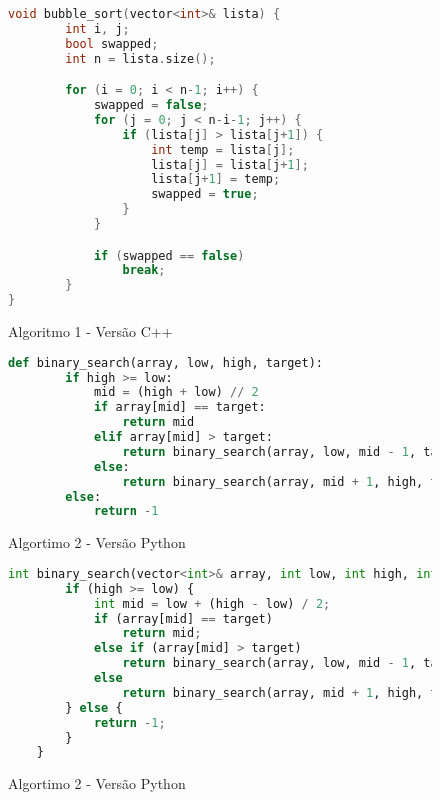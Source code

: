 \documentclass{article}
\begin{document}
\begin{figure} [!ht]
    \begin{lstlisting}[language=c++]
    void bubble_sort(vector<int>& lista) {
        int i, j;
        bool swapped;
        int n = lista.size();

        for (i = 0; i < n-1; i++) {
            swapped = false;
            for (j = 0; j < n-i-1; j++) {
                if (lista[j] > lista[j+1]) {
                    int temp = lista[j];
                    lista[j] = lista[j+1];
                    lista[j+1] = temp;
                    swapped = true;
                }
            }

            if (swapped == false)
                break;
        }
}

    \end{lstlisting}
        \label{fig:alg1_cpp}
        \caption{Algoritmo 1 - Versão C++}
\end{figure}

\begin{figure}

\begin{lstlisting}[language=Python]
    def binary_search(array, low, high, target):
        if high >= low:
            mid = (high + low) // 2
            if array[mid] == target:
                return mid
            elif array[mid] > target:
                return binary_search(array, low, mid - 1, target)
            else:
                return binary_search(array, mid + 1, high, target)
        else:
            return -1
    \end{lstlisting}
    \label{fig:alg2_python}
    \caption{Algortimo 2 - Versão Python}
\end{figure}

\begin{figure}
\begin{lstlisting}[language=Python]
    int binary_search(vector<int>& array, int low, int high, int target) {
        if (high >= low) {
            int mid = low + (high - low) / 2;  
            if (array[mid] == target)
                return mid;
            else if (array[mid] > target)
                return binary_search(array, low, mid - 1, target);
            else
                return binary_search(array, mid + 1, high, target);
        } else {
            return -1;
        }
    }
    \end{lstlisting}
    \label{fig:alg2_cpp}
    \caption{Algortimo 2 - Versão Python}
\end{figure}

%
%
\end{document}
